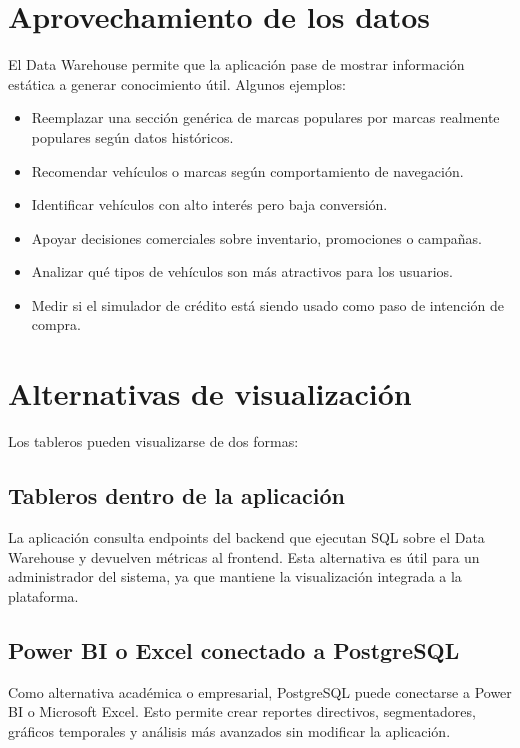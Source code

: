 \documentclass[12pt,letterpaper]{article}
\begin{document}
\section{Aprovechamiento de los datos}

El Data Warehouse permite que la aplicación pase de mostrar información estática a generar conocimiento útil. Algunos ejemplos:

\begin{itemize}
    \item Reemplazar una sección genérica de marcas populares por marcas realmente populares según datos históricos.
    \item Recomendar vehículos o marcas según comportamiento de navegación.
    \item Identificar vehículos con alto interés pero baja conversión.
    \item Apoyar decisiones comerciales sobre inventario, promociones o campañas.
    \item Analizar qué tipos de vehículos son más atractivos para los usuarios.
    \item Medir si el simulador de crédito está siendo usado como paso de intención de compra.
\end{itemize}

\section{Alternativas de visualización}

Los tableros pueden visualizarse de dos formas:

\subsection{Tableros dentro de la aplicación}

La aplicación consulta endpoints del backend que ejecutan SQL sobre el Data Warehouse y devuelven métricas al frontend. Esta alternativa es útil para un administrador del sistema, ya que mantiene la visualización integrada a la plataforma.

\subsection{Power BI o Excel conectado a PostgreSQL}

Como alternativa académica o empresarial, PostgreSQL puede conectarse a Power BI o Microsoft Excel. Esto permite crear reportes directivos, segmentadores, gráficos temporales y análisis más avanzados sin modificar la aplicación.
\end{document}
